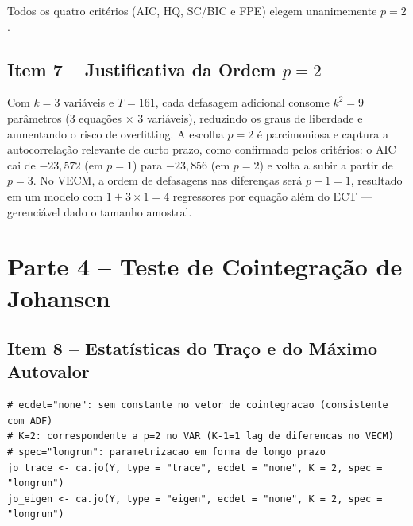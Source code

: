 \documentclass[12pt,a4paper]{article}
\begin{document}
\noindent
Todos os quatro critérios (AIC, HQ, SC/BIC e FPE) elegem unanimemente $p = 2$.

\subsection{Item 7 -- Justificativa da Ordem $p = 2$}

Com $k = 3$ variáveis e $T = 161$, cada defasagem adicional consome
$k^2 = 9$ parâmetros (3 equações $\times$ 3 variáveis), reduzindo os graus
de liberdade e aumentando o risco de overfitting.
A escolha $p = 2$ é parcimoniosa e captura a autocorrelação relevante de
curto prazo, como confirmado pelos critérios: o AIC cai de $-23{,}572$
(em $p=1$) para $-23{,}856$ (em $p=2$) e volta a subir a partir de $p=3$.
No VECM, a ordem de defasagens nas diferenças será $p - 1 = 1$, resultado
em um modelo com $1 + 3 \times 1 = 4$ regressores por equação além do ECT
--- gerenciável dado o tamanho amostral.

\section{Parte 4 -- Teste de Cointegração de Johansen}

\subsection{Item 8 -- Estatísticas do Traço e do Máximo Autovalor}

\begin{lstlisting}[caption={Teste de Johansen com ca.jo() — ecdet="none", K=2}]
# ecdet="none": sem constante no vetor de cointegracao (consistente com ADF)
# K=2: correspondente a p=2 no VAR (K-1=1 lag de diferencas no VECM)
# spec="longrun": parametrizacao em forma de longo prazo
jo_trace <- ca.jo(Y, type = "trace", ecdet = "none", K = 2, spec = "longrun")
jo_eigen <- ca.jo(Y, type = "eigen", ecdet = "none", K = 2, spec = "longrun")
\end{lstlisting}

\begin{table}[H]
\centering
\caption{Teste de Johansen --- Estatísticas e Valores Críticos ($k=3$, $T=161$)}
\label{tab:johansen}
\end{table}
\end{document}
